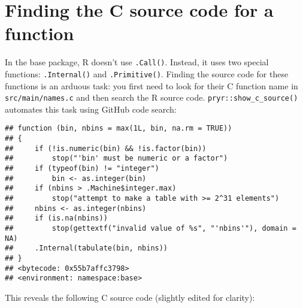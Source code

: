 \hypertarget{c-find-source}{%
\section{Finding the C source code for a function}\label{c-find-source}}

In the base package, R doesn't use \texttt{.Call()}. Instead, it uses
two special functions: \texttt{.Internal()} and \texttt{.Primitive()}.
Finding the source code for these functions is an arduous task: you
first need to look for their C function name in
\texttt{src/main/names.c} and then search the R source code.
\texttt{pryr::show\_c\_source()} automates this task using GitHub code
search:  

\begin{Shaded}
\begin{Highlighting}[]
\end{Highlighting}
\end{Shaded}

\begin{verbatim}
## function (bin, nbins = max(1L, bin, na.rm = TRUE)) 
## {
##     if (!is.numeric(bin) && !is.factor(bin)) 
##         stop("'bin' must be numeric or a factor")
##     if (typeof(bin) != "integer") 
##         bin <- as.integer(bin)
##     if (nbins > .Machine$integer.max) 
##         stop("attempt to make a table with >= 2^31 elements")
##     nbins <- as.integer(nbins)
##     if (is.na(nbins)) 
##         stop(gettextf("invalid value of %s", "'nbins'"), domain = NA)
##     .Internal(tabulate(bin, nbins))
## }
## <bytecode: 0x55b7affc3798>
## <environment: namespace:base>
\end{verbatim}

\begin{Shaded}
\begin{Highlighting}[]
\OperatorTok{::}\NormalTok{(}\NormalTok{(}
\end{Highlighting}
\end{Shaded}

This reveals the following C source code (slightly edited for clarity):


